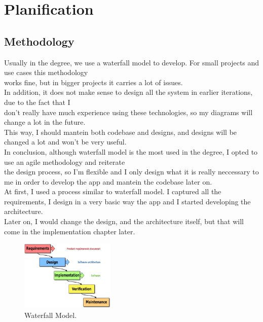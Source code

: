 \chapter{Planification}

\section{Methodology}
Usually in the degree, we use a waterfall model to develop. For small projects and use cases this methodology \\
works fine, but in bigger projects it carries a lot of issues. \\

In addition, it does not make sense to design all the system in earlier iterations, due to the fact that I \\
don't really have much experience using these technologies, so my diagrams will change a lot in the future. \\
This way, I should mantein both codebase and designs, and designs will be changed a lot and won't be very useful. \\

In conclusion, although waterfall model is the most used in the degree, I opted to use an agile methodology and reiterate \\
the design process, so I'm flexible and I only design what it is really neccessary to me in order to develop the app and mantein the codebase later on. \\

At first, I used a process similar to waterfall model. I captured all the requirements, I design in a very basic way the app and I started developing the architecture. \\
Later on, I would change the design, and the architecture itself, but that will come in the implementation chapter later. \\

\begin{figure}[H]
    \begin{center}
        \includegraphics[width=0.4\textwidth]{assets/waterfall_model.png}
        \caption{Waterfall Model. \cite{Waterfall}}
        \label{fig:planification_waterfall_model}
    \end{center}
\end{figure}

